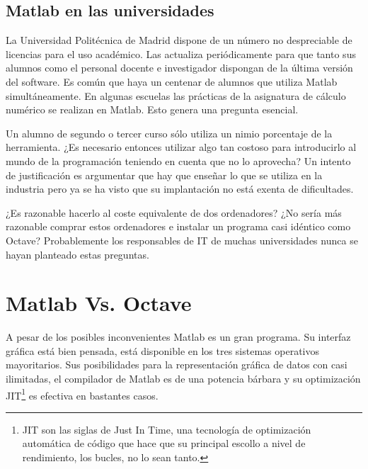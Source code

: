 \documentclass[10pt,letterpaper,conference]{ieeeconfspanish}
\begin{document}

\hypertarget{matlab-en-las-universidades}{}
\subsection*{Matlab en las universidades}

La Universidad Politécnica de Madrid dispone de un número no
despreciable de licencias para el uso académico.  Las actualiza
periódicamente para que tanto sus alumnos como el personal docente e
investigador dispongan de la última versión del software.  Es común
que haya un centenar de alumnos que utiliza Matlab simultáneamente.
En algunas escuelas las prácticas de la asignatura de cálculo numérico
se realizan en Matlab.  Esto genera una pregunta esencial.

Un alumno de segundo o tercer curso sólo utiliza un nimio porcentaje
de la herramienta. ¿Es necesario entonces utilizar algo tan costoso
para introducirlo al mundo de la programación teniendo en cuenta que
no lo aprovecha? Un intento de justificación es argumentar que hay que
enseñar lo que se utiliza en la industria pero ya se ha visto que su
implantación no está exenta de dificultades.

¿Es razonable hacerlo al coste equivalente de dos ordenadores? ¿No
sería más razonable comprar estos ordenadores e instalar un programa
casi idéntico como Octave?  Probablemente los responsables de IT de
muchas universidades nunca se hayan planteado estas preguntas.



\hypertarget{matlab-vs-octave}{}
\section*{Matlab Vs. Octave}

A pesar de los posibles inconvenientes Matlab es un gran programa.  Su
interfaz gráfica está bien pensada, está disponible en los tres
sistemas operativos mayoritarios.  Sus posibilidades para la
representación gráfica de datos con casi ilimitadas, el compilador de
Matlab es de una potencia bárbara y su optimización JIT\footnote{ JIT
  son las siglas de Just In Time, una tecnología de optimización
  automática de código que hace que su principal escollo a nivel de
  rendimiento, los bucles, no lo sean tanto.} es efectiva en bastantes
casos.
\end{document}
